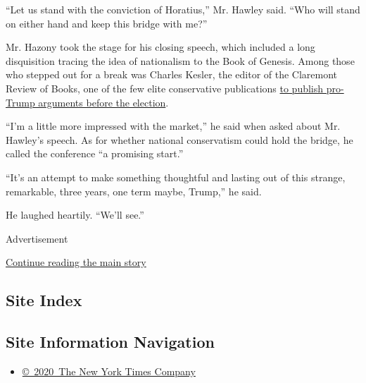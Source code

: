 ``Let us stand with the conviction of Horatius,'' Mr. Hawley said. ``Who
will stand on either hand and keep this bridge with me?''

Mr. Hazony took the stage for his closing speech, which included a long
disquisition tracing the idea of nationalism to the Book of Genesis.
Among those who stepped out for a break was Charles Kesler, the editor
of the Claremont Review of Books, one of the few elite conservative
publications
\href{https://www.nytimes3xbfgragh.onion/2017/02/20/arts/charge-the-cockpit-or-you-die-behind-an-incendiary-case-for-trump.html}{to
publish pro-Trump arguments before the election}.

``I'm a little more impressed with the market,'' he said when asked
about Mr. Hawley's speech. As for whether national conservatism could
hold the bridge, he called the conference ``a promising start.''

``It's an attempt to make something thoughtful and lasting out of this
strange, remarkable, three years, one term maybe, Trump,'' he said.

He laughed heartily. ``We'll see.''

Advertisement

\protect\hyperlink{after-bottom}{Continue reading the main story}

\hypertarget{site-index}{%
\subsection{Site Index}\label{site-index}}

\hypertarget{site-information-navigation}{%
\subsection{Site Information
Navigation}\label{site-information-navigation}}

\begin{itemize}
\tightlist
\item
  \href{https://help.nytimes3xbfgragh.onion/hc/en-us/articles/115014792127-Copyright-notice}{©~2020~The
  New York Times Company}
\end{itemize}

